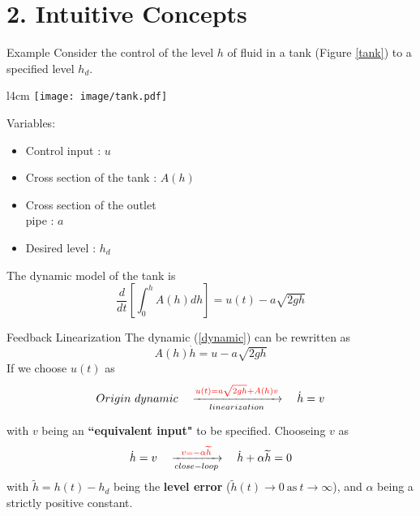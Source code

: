 \documentclass{beamer}
\begin{document}
  \section{2. Intuitive Concepts}

  \begin{frame}{Example}
    Consider the control of the level $h$ of fluid in a tank (Figure \ref{tank}) to a specified level $h_{d}$.

    \begin{wrapfigure}{l}{4cm}
    \vspace{-10pt}
    \texttt{[image: image/tank.pdf]}\\
    \vspace{-15pt}
    \caption{Fluid level control in a tank}\label{tank}
    \vspace{-10pt}
    \end{wrapfigure}

    Variables:
    \begin{itemize}
      \item Control input : $u$
      \item Cross section of the tank : $A(h)$
      \item Cross section of the outlet \\ pipe : $a$
      \item Desired level : $h_{d}$
    \end{itemize}

    The dynamic model of the tank is
    \begin{equation}\label{dynamic}
      \frac{d}{dt}\left[\int_{0}^{h}A(h)dh\right] = u(t) - a \sqrt{2gh}
    \end{equation}

  \end{frame}


  \begin{frame}{Feedback Linearization}
  The dynamic (\ref{dynamic}) can be rewritten as
  $$ A(h)\dot{h} = u-a\sqrt{2gh} $$
  If we choose $u(t)$ as
  $$
  Origin~dynamic \quad \xrightarrow[linearization]{{\color{red} u(t) = a\sqrt{2gh} + A(h)v}} \quad \dot{h}=v
  $$

  with $v$ being an \textbf{``equivalent input"} to be specified.
  Chooseing $v$ as
  $$
   \dot{h}=v \quad \xrightarrow[close-loop]{{\color{red} v=-\alpha \widetilde{h}}} \quad \dot{h}+\alpha \widetilde{h}=0
  $$
  with $\widetilde{h} = h(t)-h_{d}$ being the \textbf{level error} ($\widetilde{h}(t)\rightarrow 0 ~\text{as}~ t \rightarrow \infty$), and $\alpha$ being a strictly positive constant.
  \end{frame}
\end{document}
